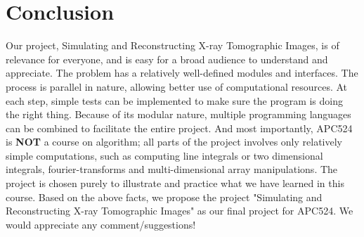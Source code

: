 \documentclass[11]{article}
\begin{document}
\section{Conclusion}
Our project, Simulating and Reconstructing X-ray Tomographic Images, is of relevance for everyone, and is easy for a broad audience to understand and appreciate. The problem has a relatively well-defined modules and interfaces. The process is parallel in nature, allowing better use of computational resources. At each step, simple tests can be implemented to make sure the program is doing the right thing. Because of its modular nature, multiple programming languages can be combined to facilitate the entire project. And most importantly, APC524 is \textbf{NOT} a course on algorithm; all parts of the project involves only relatively simple computations, such as computing line integrals or two dimensional integrals, fourier-transforms and multi-dimensional array manipulations. The project is chosen purely to illustrate and practice what we have learned in this course. Based on the above facts, we propose the project "Simulating and Reconstructing X-ray Tomographic Images" as our final project for APC524. We would appreciate any comment/suggestions! 
\end{document}
